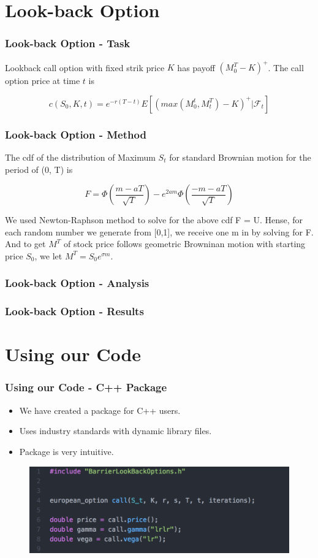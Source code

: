 \documentclass[12pt]{beamer}
\begin{document}
\section{Look-back Option}
\begin{frame}
\frametitle{Look-back Option - Task}
Lookback call option with fixed strik price $K$ has payoff $(M^T_{0}-K)^+$. The call option price at time $t$ is

$$c(S_0,K,t) = e^{-r(T-t)}E[(max(M^t_0,M^T_t)-K)^+|\mathcal{F}_t] $$


\end{frame}

\begin{frame}
\frametitle{Look-back Option - Method}
The cdf of the distribution of Maximum $S_t$ for standard Brownian motion for the period of (0, T) is

$$F = \Phi(\frac{m-aT}{\sqrt{T}})-e^{2am}\Phi(\frac{-m-aT}{\sqrt{T}})$$

We used Newton-Raphson method to solve for the above cdf F = U. Hense, for each random number we generate from [0,1], we receive one m in by solving for F. And to get $M^T$ of stock price follows geometric Browninan motion with starting price $S_0$, we let $M^T=S_0e^{\sigma m }$.\\


\end{frame}

\begin{frame}
\frametitle{Look-back Option - Analysis}
\end{frame}

\begin{frame}
\frametitle{Look-back Option - Results}

\end{frame}


\section{Using our Code}
\begin{frame}
\frametitle{Using our Code - C++ Package}
\begin{itemize}
  \item We have created a package for C++ users.
  \item Uses industry standards with dynamic library files.
  \item Package is very intuitive.
\end{itemize}

\begin{figure}[h!]
  \centering
\includegraphics[width=\textwidth]{graphs/code_easy_demo.png}
\end{figure}
\end{frame}
\end{document}
